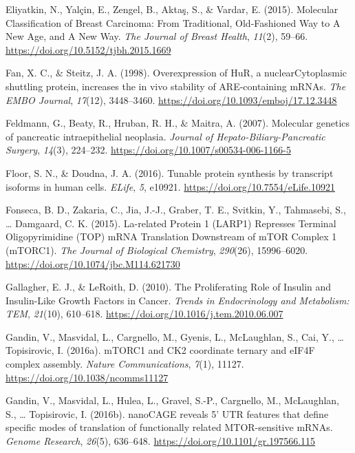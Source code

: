 \documentclass[12pt,openany]{book}
\begin{document}
\hypertarget{ref-Eliyatkin2015}{}
Eliyatkin, N., Yalçin, E., Zengel, B., Aktaş, S., \& Vardar, E. (2015).
Molecular Classification of Breast Carcinoma: From Traditional,
Old-Fashioned Way to A New Age, and A New Way. \emph{The Journal of
Breast Health}, \emph{11}(2), 59--66.
\url{https://doi.org/10.5152/tjbh.2015.1669}

\hypertarget{ref-Fan1998}{}
Fan, X. C., \& Steitz, J. A. (1998). Overexpression of HuR, a
nuclearCytoplasmic shuttling protein, increases the in vivo stability of
ARE-containing mRNAs. \emph{The EMBO Journal}, \emph{17}(12),
3448--3460. \url{https://doi.org/10.1093/emboj/17.12.3448}

\hypertarget{ref-Feldmann2007}{}
Feldmann, G., Beaty, R., Hruban, R. H., \& Maitra, A. (2007). Molecular
genetics of pancreatic intraepithelial neoplasia. \emph{Journal of
Hepato-Biliary-Pancreatic Surgery}, \emph{14}(3), 224--232.
\url{https://doi.org/10.1007/s00534-006-1166-5}

\hypertarget{ref-Floor2016}{}
Floor, S. N., \& Doudna, J. A. (2016). Tunable protein synthesis by
transcript isoforms in human cells. \emph{ELife}, \emph{5}, e10921.
\url{https://doi.org/10.7554/eLife.10921}

\hypertarget{ref-Fonseca2015}{}
Fonseca, B. D., Zakaria, C., Jia, J.-J., Graber, T. E., Svitkin, Y.,
Tahmasebi, S., \ldots{} Damgaard, C. K. (2015). La-related Protein 1
(LARP1) Represses Terminal Oligopyrimidine (TOP) mRNA Translation
Downstream of mTOR Complex 1 (mTORC1). \emph{The Journal of Biological
Chemistry}, \emph{290}(26), 15996--6020.
\url{https://doi.org/10.1074/jbc.M114.621730}

\hypertarget{ref-Gallagher2010}{}
Gallagher, E. J., \& LeRoith, D. (2010). The Proliferating Role of
Insulin and Insulin-Like Growth Factors in Cancer. \emph{Trends in
Endocrinology and Metabolism: TEM}, \emph{21}(10), 610--618.
\url{https://doi.org/10.1016/j.tem.2010.06.007}

\hypertarget{ref-Gandin2016}{}
Gandin, V., Masvidal, L., Cargnello, M., Gyenis, L., McLaughlan, S.,
Cai, Y., \ldots{} Topisirovic, I. (2016a). mTORC1 and CK2 coordinate
ternary and eIF4F complex assembly. \emph{Nature Communications},
\emph{7}(1), 11127. \url{https://doi.org/10.1038/ncomms11127}

\hypertarget{ref-Gandin2016a}{}
Gandin, V., Masvidal, L., Hulea, L., Gravel, S.-P., Cargnello, M.,
McLaughlan, S., \ldots{} Topisirovic, I. (2016b). nanoCAGE reveals 5'
UTR features that define specific modes of translation of functionally
related MTOR-sensitive mRNAs. \emph{Genome Research}, \emph{26}(5),
636--648. \url{https://doi.org/10.1101/gr.197566.115}
\end{document}

